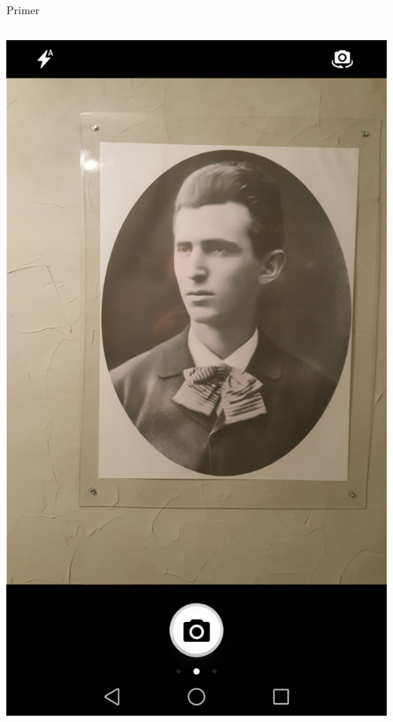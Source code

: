 \documentclass{beamer}
\begin{document}
\begin{frame}{Primer}
\begin{columns}
\begin{column}{0.5\textwidth}
    \begin{center}
        \includegraphics[scale=0.093]{./slike/young_tesla_real.jpg}
    \end{center}
\end{column}
\begin{column}{0.5\textwidth}
    \begin{center}

\end{center}
\end{column}
\end{columns}
\end{frame}
\end{document}
